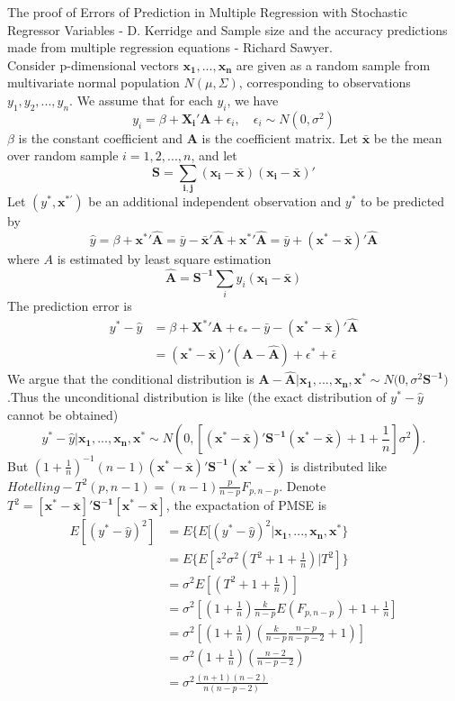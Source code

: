 \documentclass[11pt]{article}
\begin{document}
The proof of Errors of Prediction in Multiple Regression
 with Stochastic Regressor Variables - D. Kerridge and Sample size and the accuracy predictions made from multiple regression equations - Richard Sawyer.
\\
Consider p-dimensional vectors $\boldsymbol{x_1},...,\boldsymbol{x_n}$ are given as a random sample from multivariate normal population $N(\mu, \Sigma)$, corresponding to observations $y_1,y_2,...,y_n$. We assume that for each $y_i$, we have $$y_i = \beta + \boldsymbol{X_{i}'A}+\epsilon_i,  \quad \epsilon_i \sim N(0, \sigma^2)$$
$\beta$ is the constant coefficient and $\boldsymbol{A}$ is the coefficient matrix. Let $\boldsymbol{\bar{x}}$ be the mean over random sample $i=1,2,...,n$, and let 
$$\boldsymbol{S= \sum_{i,j}(x_i-\bar{x})(x_i-\bar{x})'}$$
Let $(y^{*},\boldsymbol{x^{*'}})$ be an additional independent observation and $y^{*}$ to be predicted by 
$$\hat{y}= \beta+\boldsymbol{{x^{*}}'\widehat{A}}= \bar{y}-\boldsymbol{\bar{x}'\widehat{A}}+\boldsymbol{{x^{*}}'\widehat{A}}=
\bar{y}+\boldsymbol{(x^{*}-\bar{x})'\widehat{A}}$$
where $A$ is estimated by least square estimation
$$\boldsymbol{\widehat{A}}= \boldsymbol{S^{-1}}\sum_{i}y_i(\boldsymbol{x_{i}-\bar{x}})$$
The prediction error is 
\begin{equation}
\begin{aligned}
y^{*}-\hat{y}&=\beta + \boldsymbol{{X^{*}}'A}+\epsilon_{*}-\bar{y}-\boldsymbol{(x^{*}-\bar{x})'\widehat{A}}\\
&=\boldsymbol{(x^{*}-\bar{x})'(A-\widehat{A})}+\epsilon^{*}+\bar{\epsilon}
\end{aligned}
\end{equation}
We argue that the conditional distribution is $\boldsymbol{A-\widehat{A} | x_{1},...,x_{n},x^{*}}\sim N(0,\sigma^{2}\boldsymbol{S^{-1})}$.Thus the unconditional distribution is like (the exact distribution of $y^{*}-\hat{y}$ cannot be obtained) 
$$y^{*}-\hat{y}|\boldsymbol{x_1,...,x_n,x^{*}}\sim N(0,[\boldsymbol{(x^{*}-\bar{x})'S^{-1}(x^{*}-\bar{x})}+1+\frac{1}{n}]\sigma^{2}).$$
But $(1+\frac{1}{n})^{-1}(n-1)\boldsymbol{(x^{*}-\bar{x})'S^{-1}(x^{*}-\bar{x})}$ is distributed like $Hotelling-T^{2}(p,n-1)=(n-1)\frac{p}{n-p}F_{p,n-p}$. Denote $T^{2}=\boldsymbol{[x^{*}-\bar{x}]'S^{-1}[x^{*}-\bar{x}]}$, the expactation of PMSE is 
\begin{equation}
\begin{aligned}
E[(y^{*}-\hat{y})^{2}]&=E\{E[(y^{*}-\hat{y})^{2}|\boldsymbol{x_1,...,x_n,x^{*}}\}\\
&=E\{E[z^{2}\sigma^{2}(T^{2}+1+\frac{1}{n})|T^{2}]\}\\
&= \sigma^{2}E[(T^{2}+1+\frac{1}{n})]\\
&=\sigma^{2}[(1+\frac{1}{n})\frac{k}{n-p}E(F_{p,n-p})+1+\frac{1}{n}]\\
&=\sigma^{2}[(1+\frac{1}{n})(\frac{k}{n-p}\frac{n-p}{n-p-2}+1)]\\
&=\sigma^{2}(1+\frac{1}{n})(\frac{n-2}{n-p-2})\\
&=\sigma^{2}\frac{(n+1)(n-2)}{n(n-p-2)}
\end{aligned}
\end{equation}
\end{document}
